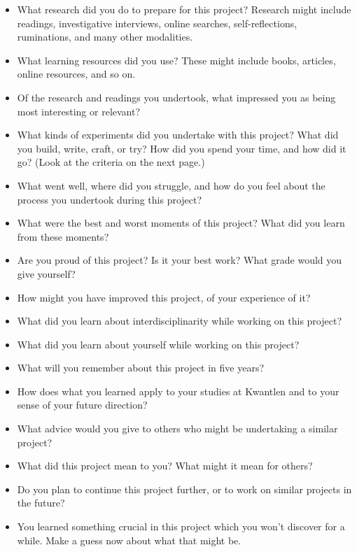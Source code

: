 \documentclass[letterpaper,10pt,headsepline]{scrreprt}
\begin{document}
 \begin{itemize}
\item What research did you do to prepare for this project? Research might include readings, investigative interviews, online searches, self-reflections, ruminations, and many other modalities. 

\item What learning resources did you use? These might include books, articles, online resources, and so on.

\item Of the research and readings you undertook, what impressed you as being most interesting or relevant?

\item What kinds of experiments did you undertake with this project? What did you build, write, craft, or try? How did you spend your time, and how did it go? (Look at the criteria on the next page.)

\item What went well, where did you struggle, and how do you feel about the process you undertook during this project?

\item What were the best and worst moments of this project? What did you learn from these moments?

\item Are you proud of this project? Is it your best work? What grade would you give yourself?

\item How might you have improved this project, of your experience of it?

\item What did you learn about interdisciplinarity while working on this project?

\item What did you learn about yourself while working on this project?

\item What will you remember about this project in five years?

\item How does what you learned apply to your studies at Kwantlen and to your sense of your future direction?

\item What advice would you give to others who might be undertaking a similar project?

\item What did this project mean to you? What might it mean for others?

\item Do you plan to continue this project further, or to work on similar projects in the future?

\item You learned something crucial in this project which you won't discover for a while. Make a guess now about what that might be.

\end{itemize}
\end{document}
